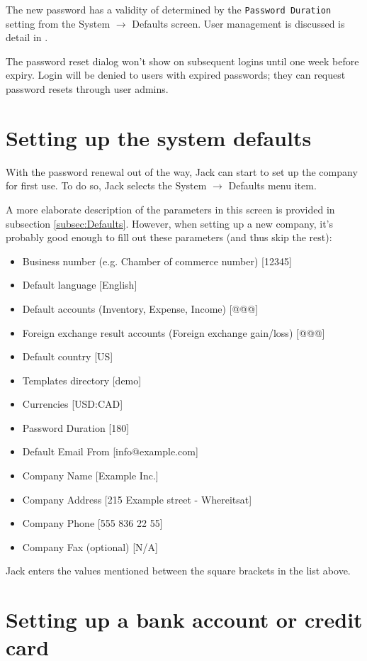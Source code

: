 The new password has a validity of determined by the \texttt{Password Duration} setting
from the System $\rightarrow$ Defaults screen. User management is discussed is detail in .

The password reset dialog won't show on subsequent logins until one week
before expiry. Login will be denied to users with expired passwords; they can request
password resets through user admins.


\section{Setting up the system defaults}

With the password renewal out of the way, Jack can start to set up the company for first
use. To do so, Jack selects the System $\rightarrow$ Defaults menu item.

A more elaborate description of the parameters in this screen is provided in subsection
\ref{subsec:Defaults}. However, when setting up a new company, it's probably good enough
to fill out these parameters (and thus skip the rest):

\begin{itemize}
\item Business number (e.g. Chamber of commerce number) [12345]
\item Default language [English]
\item Default accounts (Inventory, Expense, Income) [@@@]
\item Foreign exchange result accounts (Foreign exchange gain/loss) [@@@]
\item Default country [US]
\item Templates directory [demo]
\item Currencies [USD:CAD]
\item Password Duration [180]
\item Default Email From [info@example.com]
\item Company Name [Example Inc.]
\item Company Address [215 Example street - Whereitsat]
\item Company Phone [555 836 22 55]
\item Company Fax (optional) [N/A]
\end{itemize}

Jack enters the values mentioned between the square brackets in the list above.

\section{Setting up a bank account or credit card}
\label{sec:setup-bank-account}

